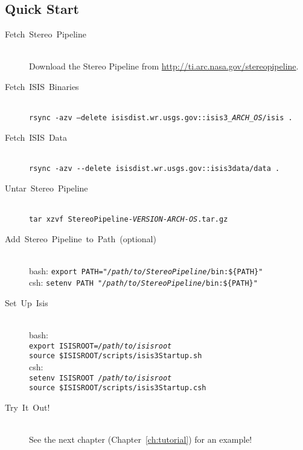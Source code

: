 \subsection{Quick Start}
\begin{description}

\item[{Fetch~Stereo~Pipeline}] ~\\
Download the Stereo Pipeline from \url{http://ti.arc.nasa.gov/stereopipeline}.

\item [{Fetch~ISIS~Binaries}] ~\\
\texttt{rsync -azv --delete isisdist.wr.usgs.gov::isis3\_\textit{ARCH\_OS}/isis .}

\item [{Fetch~ISIS~Data}] ~\\
\verb#rsync -azv --delete isisdist.wr.usgs.gov::isis3data/data .#

\item [{Untar~Stereo~Pipeline}] ~\\
\texttt{tar xzvf StereoPipeline-\textit{VERSION-ARCH-OS}.tar.gz}

\item [{Add~Stereo~Pipeline~to~Path~(optional)}] ~\\
bash: \texttt{export PATH="\textit{/path/to/StereoPipeline}/bin:\$\{PATH\}"} \\
csh:  \texttt{setenv PATH "\textit{/path/to/StereoPipeline}/bin:\$\{PATH\}"}

\pagebreak
\item[Set~Up~Isis] ~\\
bash: \\
\hspace*{2em}\texttt{export ISISROOT=\textit{/path/to/isisroot}} \\
\hspace*{2em}\texttt{source \$ISISROOT/scripts/isis3Startup.sh} \\
csh: \\
\hspace*{2em}\texttt{setenv ISISROOT \textit{/path/to/isisroot}} \\
\hspace*{2em}\texttt{source \$ISISROOT/scripts/isis3Startup.csh}

\item [{Try~It~Out!}] ~\\
See the next chapter (Chapter~\ref{ch:tutorial}) for an example!
\end{description}


